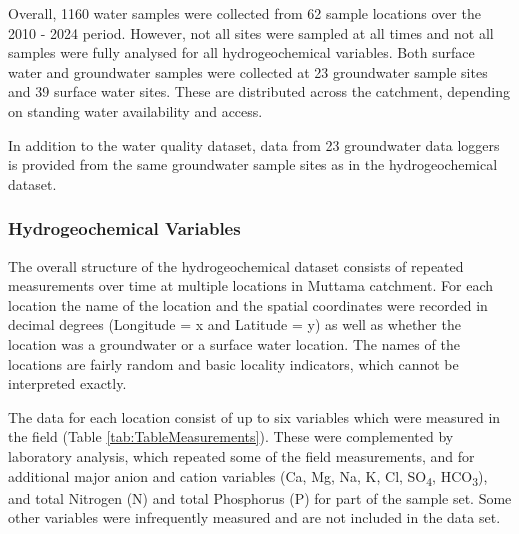 \documentclass[, manuscript]{copernicus}
\begin{document}
Overall, 1160 water samples were collected from 62 sample locations over
the 2010 - 2024 period. However, not all sites were sampled at all times
and not all samples were fully analysed for all hydrogeochemical
variables. Both surface water and groundwater samples were collected at
23 groundwater sample sites and 39 surface water sites. These are
distributed across the catchment, depending on standing water
availability and access.

In addition to the water quality dataset, data from 23 groundwater data
loggers is provided from the same groundwater sample sites as in the
hydrogeochemical dataset.

\subsubsection{Hydrogeochemical Variables}

The overall structure of the hydrogeochemical dataset consists of
repeated measurements over time at multiple locations in Muttama
catchment. For each location the name of the location and the spatial
coordinates were recorded in decimal degrees (Longitude = x and Latitude
= y) as well as whether the location was a groundwater or a surface
water location. The names of the locations are fairly random and basic
locality indicators, which cannot be interpreted exactly.

The data for each location consist of up to six variables which were
measured in the field (Table \ref{tab:TableMeasurements}). These were
complemented by laboratory analysis, which repeated some of the field
measurements, and for additional major anion and cation variables (Ca,
Mg, Na, K, Cl, SO\textsubscript{4}, HCO\textsubscript{3}), and total
Nitrogen (N) and total Phosphorus (P) for part of the sample set. Some
other variables were infrequently measured and are not included in the
data set.

\begin{table}
\centering
\caption{\label{tab:TableMeasurements}Variables measured in the field and laboratory.}
\centering
{}
\end{table}
\end{document}
